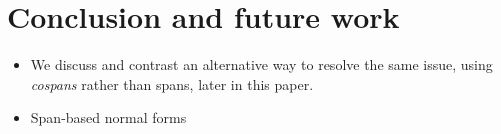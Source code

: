 \section{Conclusion and future work}

\begin{itemize}
\item We discuss and contrast an alternative way to resolve the same issue, using \emph{cospans} rather than spans, later in this paper.

\item Span-based normal forms
\end{itemize}
